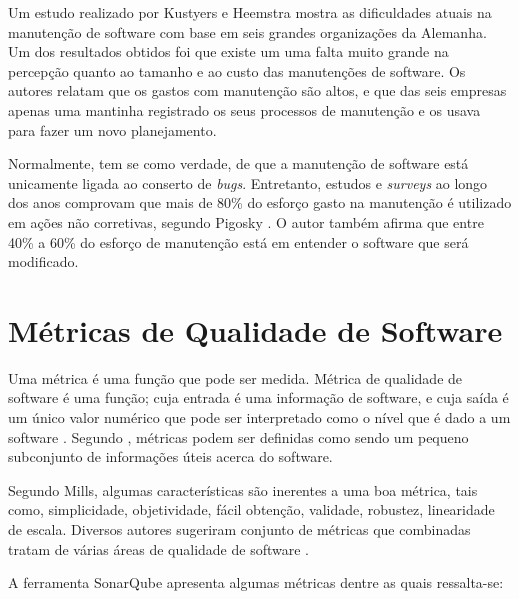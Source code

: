 Um estudo realizado por Kustyers e Heemstra \cite{kusters} mostra as dificuldades atuais na manutenção de software com base em seis grandes organizações da Alemanha. Um dos resultados obtidos foi que existe um uma falta muito grande na percepção quanto ao tamanho e ao custo das manutenções de software. Os autores relatam que os gastos com manutenção são altos, e que das seis empresas apenas uma mantinha registrado os seus processos de manutenção e os usava para fazer um novo planejamento. 

Normalmente, tem se como verdade, de que a manutenção de software está unicamente ligada ao conserto de \textit{bugs}. Entretanto, estudos e \textit{surveys} ao longo dos anos comprovam que mais de 80\% do esforço gasto na manutenção é utilizado em ações não corretivas, segundo Pigosky \cite{pigosky}. O autor também afirma que entre 40\% a 60\% do esforço de manutenção está em entender o software que será modificado.

\section{Métricas de Qualidade de Software}

Uma métrica é uma função que pode ser medida. Métrica de qualidade de software é uma função; cuja entrada é uma informação de software, e cuja saída é um único valor numérico que pode ser interpretado como o nível que é dado a um software \cite{karner}. Segundo \cite{pressman}, métricas podem ser definidas como sendo um pequeno subconjunto de informações úteis acerca do software.

Segundo Mills, algumas características são inerentes a uma boa métrica, tais como, simplicidade, objetividade, fácil obtenção, validade, robustez, linearidade de escala. Diversos autores sugeriram conjunto de métricas que combinadas tratam de várias áreas de qualidade de software \cite{paulo_meirelles}.

A ferramenta SonarQube apresenta algumas métricas dentre as quais ressalta-se:


